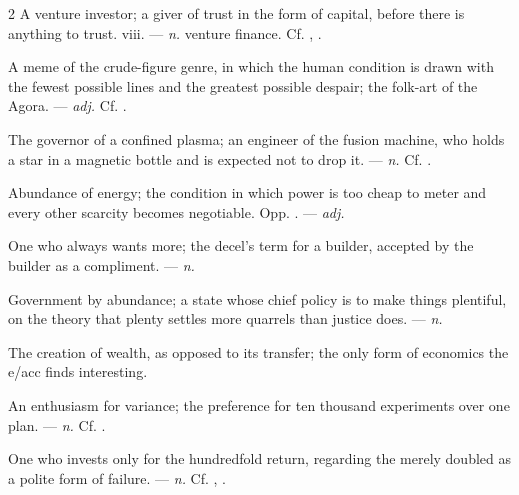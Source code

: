 \begin{multicols}{2}
 A venture investor; a giver of trust in the form of capital, before there is anything to trust.   viii. —  \textit{n.} venture finance. Cf. , .

 A meme of the crude-figure genre, in which the human condition is drawn with the fewest possible lines and the greatest possible despair; the folk-art of the Agora. —  \textit{adj.} Cf. .

 The governor of a confined plasma; an engineer of the fusion machine, who holds a star in a magnetic bottle and is expected not to drop it. —  \textit{n.} Cf. .

 Abundance of energy; the condition in which power is too cheap to meter and every other scarcity becomes negotiable. Opp. . —  \textit{adj.}

  One who always wants more; the decel's term for a builder, accepted by the builder as a compliment.   —  \textit{n.}

 Government by abundance; a state whose chief policy is to make things plentiful, on the theory that plenty settles more quarrels than justice does. —  \textit{n.}

 The creation of wealth, as opposed to its transfer; the only form of economics the e/acc finds interesting.

 An enthusiasm for variance; the preference for ten thousand experiments over one plan. —  \textit{n.} Cf. .

 One who invests only for the hundredfold return, regarding the merely doubled as a polite form of failure.  —  \textit{n.} Cf. , .


\end{multicols}
